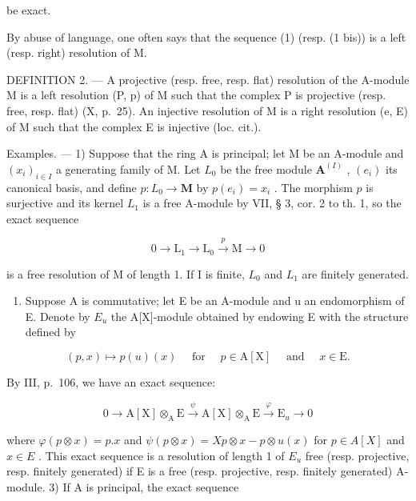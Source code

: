 be exact.

By abuse of language, one often says that the sequence (1) (resp. (1 bis)) is a left (resp. right) resolution of M.

DEFINITION 2. --- A projective (resp. free, resp. flat) resolution of the A-module M is a left resolution (P, p) of M such that the complex P is projective (resp. free, resp. flat) (X, p.~25). An injective resolution of M is a right resolution (e, E) of M such that the complex E is injective (loc. cit.).

Examples. --- 1) Suppose that the ring A is principal; let M be an A-module and \((x_{i})_{i\in I}\) a generating family of M. Let \(L_{0}\) be the free module \(\mathbf{A}^{(I)}\) , \((e_{i})\) its canonical basis, and define \(p:L_{0}\to\mathbf{M}\) by \(p(e_{i})=x_{i}\) . The morphism \(p\) is surjective and its kernel \(L_{1}\) is a free A-module by VII, § 3, cor. 2 to th. 1, so the exact sequence

\[
0 \to \mathrm{L} _ {1} \to \mathrm{L} _ {0} \xrightarrow {p} \mathrm{M} \to 0
\]

is a free resolution of M of length 1. If I is finite, \(L_{0}\) and \(L_{1}\) are finitely generated.

\begin{enumerate}
\def\labelenumi{\arabic{enumi})}
\setcounter{enumi}{1}
\tightlist
\item
  Suppose A is commutative; let E be an A-module and u an endomorphism of E. Denote by \(E_{u}\) the A{[}X{]}-module obtained by endowing E with the structure defined by
\end{enumerate}

\[
(p, x) \mapsto p (u) (x) \quad \text { for } \quad p \in \mathrm{A} [ \mathrm{X} ] \quad \text { and } \quad x \in \mathrm{E}.
\]

By III, p.~106, we have an exact sequence:

\[
0 \to \mathrm{A} [ \mathrm{X} ] \otimes_ {\mathrm{A}} \mathrm{E} \stackrel {\psi} {\to} \mathrm{A} [ \mathrm{X} ] \otimes_ {\mathrm{A}} \mathrm{E} \stackrel {\varphi} {\to} \mathrm{E} _ {u} \to 0
\]

where \(\varphi(p \otimes x) = p.x\) and \(\psi(p \otimes x) = Xp \otimes x - p \otimes u(x)\) for \(p \in A[X]\) and \(x \in E\) . This exact sequence is a resolution of length 1 of \(E_u\) free (resp. projective, resp. finitely generated) if E is a free (resp. projective, resp. finitely generated) A-module. 3) If A is principal, the exact sequence

